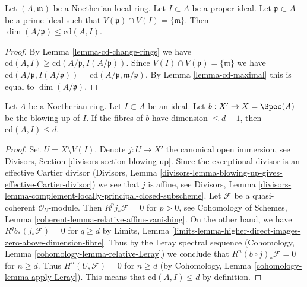 \begin{lemma}
\label{lemma-cd-bound-dim-local}
Let $(A, \mathfrak m)$ be a Noetherian local ring.
Let $I \subset A$ be a proper ideal.
Let $\mathfrak p \subset A$ be a prime ideal
such that $V(\mathfrak p) \cap V(I) = \{\mathfrak m\}$.
Then $\dim(A/\mathfrak p) \leq \text{cd}(A, I)$.
\end{lemma}

\begin{proof}
By Lemma \ref{lemma-cd-change-rings} we have
$\text{cd}(A, I) \geq \text{cd}(A/\mathfrak p, I(A/\mathfrak p))$.
Since $V(I) \cap V(\mathfrak p) = \{\mathfrak m\}$ we have
$\text{cd}(A/\mathfrak p, I(A/\mathfrak p)) =
\text{cd}(A/\mathfrak p, \mathfrak m/\mathfrak p)$.
By Lemma \ref{lemma-cd-maximal} this is equal to $\dim(A/\mathfrak p)$.
\end{proof}

\begin{lemma}
\label{lemma-cd-blowup}
Let $A$ be a Noetherian ring. Let $I \subset A$ be an ideal.
Let $b : X' \to X = \Spec(A)$ be the blowing up of $I$.
If the fibres of $b$ have dimension $\leq d - 1$, then
$\text{cd}(A, I) \leq d$.
\end{lemma}

\begin{proof}
Set $U = X \setminus V(I)$. Denote $j : U \to X'$ the canonical open
immersion, see Divisors, Section \ref{divisors-section-blowing-up}.
Since the exceptional divisor is an effective Cartier divisor
(Divisors, Lemma
\ref{divisors-lemma-blowing-up-gives-effective-Cartier-divisor})
we see that $j$ is affine, see
Divisors, Lemma
\ref{divisors-lemma-complement-locally-principal-closed-subscheme}.
Let $\mathcal{F}$ be a quasi-coherent $\mathcal{O}_U$-module.
Then $R^pj_*\mathcal{F} = 0$ for $p > 0$, see
Cohomology of Schemes, Lemma
\ref{coherent-lemma-relative-affine-vanishing}.
On the other hand, we have $R^qb_*(j_*\mathcal{F}) = 0$ for
$q \geq d$ by Limits, Lemma
\ref{limits-lemma-higher-direct-images-zero-above-dimension-fibre}.
Thus by the Leray spectral sequence
(Cohomology, Lemma \ref{cohomology-lemma-relative-Leray})
we conclude that $R^n(b \circ j)_*\mathcal{F} = 0$ for
$n \geq d$. Thus $H^n(U, \mathcal{F}) = 0$ for $n \geq d$
(by Cohomology, Lemma \ref{cohomology-lemma-apply-Leray}).
This means that $\text{cd}(A, I) \leq d$ by definition.
\end{proof}







